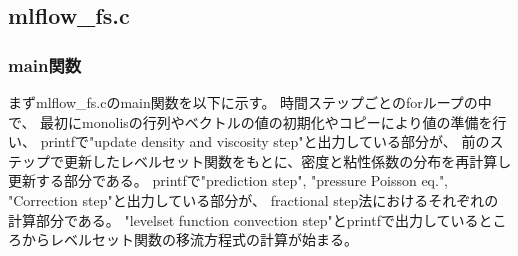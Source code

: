 \documentclass[8pt,a4paper]{article}
\begin{document}
\subsection{mlflow\_fs.c}
\subsubsection{main関数}
まずmlflow\_fs.cのmain関数を以下に示す。
時間ステップごとのforループの中で、
最初にmonolisの行列やベクトルの値の初期化やコピーにより値の準備を行い、
printfで"update density and viscosity step"と出力している部分が、
前のステップで更新したレベルセット関数をもとに、密度と粘性係数の分布を再計算し更新する部分である。
printfで"prediction step", "pressure Poisson eq.", "Correction step"と出力している部分が、
fractional step法におけるそれぞれの計算部分である。
"levelset function convection step"とprintfで出力しているところからレベルセット関数の移流方程式の計算が始まる。
\end{document}
